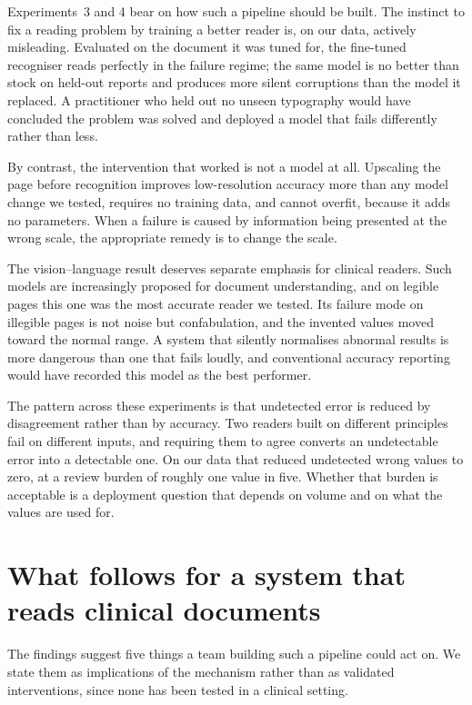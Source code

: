 \documentclass[11pt]{article}
\begin{document}
Experiments~3 and 4 bear on how such a pipeline should be built. The instinct to fix a reading
problem by training a better reader is, on our data, actively misleading. Evaluated on the
document it was tuned for, the fine-tuned recogniser reads perfectly in the failure regime; the
same model is no better than stock on held-out reports and produces more silent corruptions
than the model it replaced. A practitioner who held out no unseen typography would have
concluded the problem was solved and deployed a model that fails differently rather than less.

By contrast, the intervention that worked is not a model at all. Upscaling the page before
recognition improves low-resolution accuracy more than any model change we tested, requires no
training data, and cannot overfit, because it adds no parameters. When a failure is caused by
information being presented at the wrong scale, the appropriate remedy is to change the scale.

The vision--language result deserves separate emphasis for clinical readers. Such models are
increasingly proposed for document understanding, and on legible pages this one was the most
accurate reader we tested. Its failure mode on illegible pages is not noise but confabulation,
and the invented values moved toward the normal range. A system that silently normalises
abnormal results is more dangerous than one that fails loudly, and conventional accuracy
reporting would have recorded this model as the best performer.

The pattern across these experiments is that undetected error is reduced by disagreement rather
than by accuracy. Two readers built on different principles fail on different inputs, and requiring them
to agree converts an undetectable error into a detectable one. On our data that reduced
undetected wrong values to zero, at a review burden of roughly one value in five. Whether that
burden is acceptable is a deployment question that depends on volume and on what the values are
used for.

\section{What follows for a system that reads clinical documents}

The findings suggest five things a team building such a pipeline could act on. We state them as
implications of the mechanism rather than as validated interventions, since none has been tested
in a clinical setting.
\end{document}
